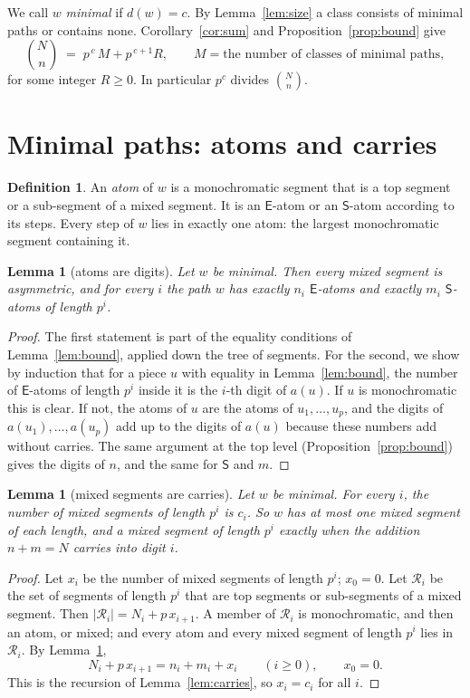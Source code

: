 \documentclass[11pt]{article}
\newtheorem{lemma}[theorem]{Lemma}
\theoremstyle{definition}
\newtheorem{definition}[theorem]{Definition}
\theoremstyle{remark}
\newcommand{\E}{\textsf{E}}
\newcommand{\Ss}{\textsf{S}}
\begin{document}
We call $w$ \emph{minimal} if $d(w)=c$. By Lemma~\ref{lem:size} a class consists of minimal paths or contains
none. Corollary~\ref{cor:sum} and Proposition~\ref{prop:bound} give
\begin{equation}\label{eq:modp}
\binom Nn\;=\;p^{\,c}\,M+p^{\,c+1}R,\qquad M=\text{the number of classes of minimal paths},
\end{equation}
for some integer $R\ge0$. In particular $p^c$ divides $\binom Nn$.

\section{Minimal paths: atoms and carries}\label{sec:minimal}

\begin{definition}
An \emph{atom} of $w$ is a monochromatic segment that is a top segment or a sub-segment of a mixed segment. It is an
$\E$-atom or an $\Ss$-atom according to its steps. Every step of $w$ lies in exactly one atom: the largest
monochromatic segment containing it.
\end{definition}

\begin{lemma}[atoms are digits]\label{lem:atoms}
Let $w$ be minimal. Then every mixed segment is asymmetric, and for every $i$ the path $w$ has exactly $n_i$
$\E$-atoms and exactly $m_i$ $\Ss$-atoms of length $p^i$.
\end{lemma}
\begin{proof}
The first statement is part of the equality conditions of Lemma~\ref{lem:bound}, applied down the tree of segments. For the second, we show by induction
that for a piece $u$ with equality in Lemma~\ref{lem:bound}, the number of $\E$-atoms of length $p^i$ inside it is the
$i$-th digit of $a(u)$. If $u$ is monochromatic this is clear. If not, the atoms of $u$ are the atoms of
$u_1,\dots,u_p$, and the digits of $a(u_1),\dots,a(u_p)$ add up to the digits of $a(u)$ because these numbers
add without carries. The same argument at the top level (Proposition~\ref{prop:bound}) gives the digits of $n$, and the
same for $\Ss$ and $m$.
\end{proof}

\begin{lemma}[mixed segments are carries]\label{lem:mixed}
Let $w$ be minimal. For every $i$, the number of mixed segments of length $p^i$ is $c_i$. So $w$ has at most
one mixed segment of each length, and a mixed segment of length $p^i$ exactly when the addition $n+m=N$ carries
into digit $i$.
\end{lemma}
\begin{proof}
Let $x_i$ be the number of mixed segments of length $p^i$; $x_0=0$. Let $\mathcal R_i$ be the set of segments of
length $p^i$ that are top segments or sub-segments of a mixed segment. Then $|\mathcal R_i|=N_i+p\,x_{i+1}$. A member
of $\mathcal R_i$ is monochromatic, and then an atom, or mixed; and every atom and every mixed segment of length
$p^i$ lies in $\mathcal R_i$. By Lemma~\ref{lem:atoms},
\[
N_i+p\,x_{i+1}=n_i+m_i+x_i\qquad(i\ge0),\qquad x_0=0 .
\]
This is the recursion of Lemma~\ref{lem:carries}, so $x_i=c_i$ for all $i$.
\end{proof}
\end{document}
